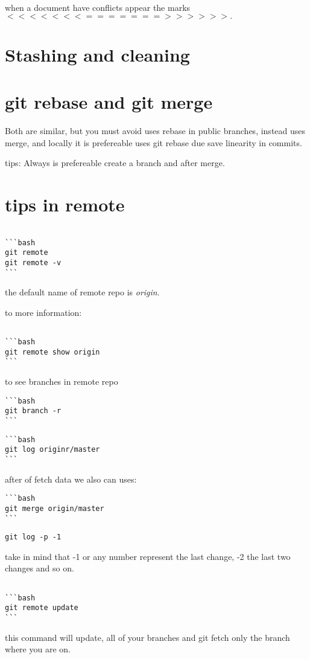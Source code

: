 \documentclass[10pt,a4paper]{article}
\begin{document}
when a document have conflicts appear the  marks $<<<<<<< ======= >>>>>>.$


\section{Stashing and cleaning}


\section{git rebase and git merge}
Both are similar, but you must avoid uses rebase in public branches, instead uses merge, and 
locally it is prefereable uses git rebase due save linearity in commits.


tips:
Always is prefereable create a branch and after merge.



\section{tips in remote}
\begin{verbatim}

```bash
git remote 
git remote -v
```

\end{verbatim}
the default name of remote repo is \textit{origin}.

to more information:
\begin{verbatim}

```bash
git remote show origin
```

\end{verbatim}
to see branches in remote repo 

\begin{verbatim}
```bash
git branch -r
``` 
\end{verbatim}

\begin{verbatim}
```bash
git log originr/master
```
\end{verbatim}

after of fetch data we also can uses:
\begin{verbatim}
```bash
git merge origin/master
```
\end{verbatim}

\begin{verbatim}
git log -p -1
\end{verbatim}
take in mind that -1 or any number represent the last change, -2 the last two changes and so on.


\begin{verbatim}

```bash
git remote update
```

\end{verbatim}
this command will update, all of your branches and git fetch only the branch where you are on.
\end{document}
